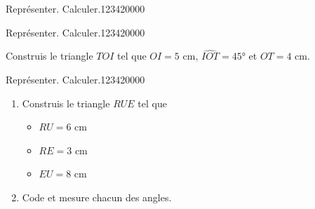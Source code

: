 \begin{pageParcoursd}
\begin{ExoCd}{Représenter. Calculer.}{1234}{2}{0}{0}{0}{0}
\end{ExoCd}

\begin{ExoCd}{Représenter. Calculer.}{1234}{2}{0}{0}{0}{0}

Construis le triangle $TOI$ tel que $OI=5$ cm, $\widehat{IOT}=45$° et $OT=4$ cm.

\vspace{4cm}
 
\end{ExoCd}

\begin{ExoCd}{Représenter. Calculer.}{1234}{2}{0}{0}{0}{0}

\begin{minipage}{0.5\linewidth}

\begin{enumerate}
\item Construis le triangle $RUE$ tel que
\begin{itemize}
\item $RU=6$ cm 
\item $RE=3$ cm
\item $EU=8$ cm
\end{itemize}
\item Code et mesure chacun des angles.
\end{enumerate}
\end{minipage}
\begin{minipage}{0.5\linewidth}
\vspace{3cm}
\end{minipage}


\vspace{5cm} 
 
 \end{ExoCd}

 
 
 
\end{pageParcoursd}

